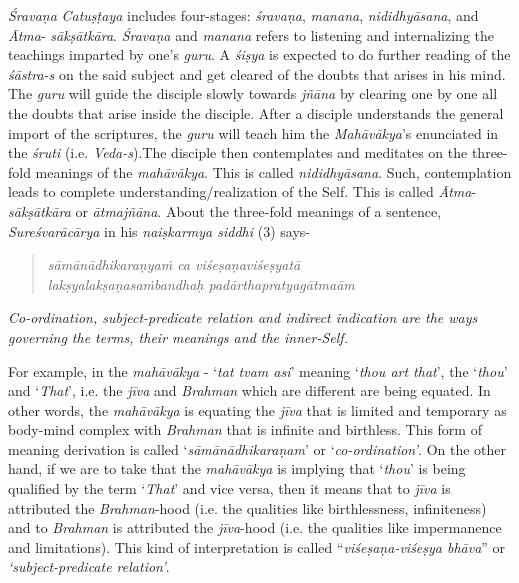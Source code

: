 \emph{Śravaṇa} \emph{Catuṣṭaya} includes four-stages: \emph{śravaṇa}, \emph{manana}, \emph{nididhyāsana}, and \emph{Ātma}- \emph{sākṣātkāra}. \emph{Śravaṇa} and \emph{manana} refers to listening and internalizing the teachings imparted by one's \emph{guru}. A \emph{śiṣya} is expected to do further reading of the \emph{śāstra-s} on the said subject and get cleared of the doubts that arises in his mind. The \emph{guru} will guide the disciple slowly towards \emph{jñāna} by clearing one by one all the doubts that arise inside the disciple. After a disciple understands the general import of the scriptures, the \emph{guru} will teach him the \emph{Mahāvākya}'s enunciated in the \emph{śruti} (i.e. \emph{Veda-s}).The disciple then contemplates and meditates on the three-fold meanings of the \emph{mahāvākya}. This is called \emph{nididhyāsana}. Such, contemplation leads to complete understanding/realization of the Self. This is called \emph{Ātma}-\emph{sākṣātkāra} or \emph{ātmajñāna}. About the three-fold meanings of a sentence, \emph{Sureśvarācārya} in his \emph{naiṣkarmya siddhi} (3) says-

\begin{verse}
\emph{sāmānādhikaraṇyaṁ ca viśeṣaṇaviśeṣyatā }\\
\emph{lakṣyalakṣaṇasaṁbandhaḥ padārthapratyagātmaām }
\end{verse}

\emph{Co-ordination, subject-predicate relation and indirect indication are the ways governing the terms, their meanings and the inner-Self.}

For example, in the \emph{mahāvākya} - `\emph{tat tvam asi}' meaning `\emph{thou art that}', the `\emph{thou}' and `\emph{That}', i.e. the \emph{jīva} and \emph{Brahman} which 	are different are being equated. In other words, the \emph{mahāvākya} is equating the \emph{jīva} that is limited and temporary as body-mind complex with \emph{Brahman} that is infinite and birthless. This form of meaning derivation is called `\emph{sāmānādhikaraṇam}' or `\emph{co-ordination'}. On the other hand, if we are to take that the \emph{mahāvākya} is implying that `\emph{thou}' is being qualified by the term `\emph{That}' and vice versa, then it means that to \emph{jīva} is attributed the \emph{Brahman}-hood (i.e. the qualities like birthlessness, infiniteness) and to \emph{Brahman} is attributed the \emph{jīva}-hood (i.e. the qualities like impermanence and limitations). This kind of interpretation is called ``\emph{viśeṣaṇa-viśeṣya bhāva}'' or \emph{`subject-predicate relation'}.

